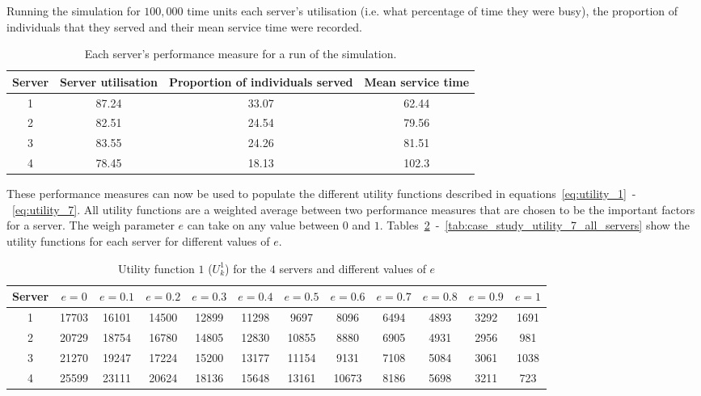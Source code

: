 Running the simulation for \(100,000\) time units each server's utilisation
(i.e. what percentage of time they were busy), the proportion of individuals
that they served and their mean service time were recorded.

\begin{table}[H]
    \caption{Each server's performance measure for a run of the simulation.}
    \label{tab:case_study_server_metrics}
    \begin{tabular}{|c|c|c|c|}
        \hline
        Server & Server utilisation & Proportion of individuals served &
        Mean service time \\
        \hline
        1 & 87.24 & 33.07 & 62.44 \\
        2 & 82.51 & 24.54 & 79.56 \\
        3 & 83.55 & 24.26 & 81.51 \\
        4 & 78.45 & 18.13 & 102.3 \\
        \hline
    \end{tabular}
\end{table}

These performance measures can now be used to populate the different utility
functions described in equations~\eqref{eq:utility_1}~-~\eqref{eq:utility_7}.
All utility functions are a weighted average between two performance measures
that are chosen to be the important factors for a server.
The weigh parameter \(e\) can take on any value between \(0\) and \(1\).
Tables~\ref{tab:case_study_utility_1_all_servers}~-~\ref{tab:case_study_utility_7_all_servers}
show the utility functions for each server for different values of \(e\).

\begin{table}[H]
    \caption{Utility function \(1\) (\(U_k^1\)) for the \(4\) servers and
    different values of \(e\)}
    \label{tab:case_study_utility_1_all_servers}
    \begin{adjustbox}{width=\columnwidth,center}
        \begin{tabular}{|c|c|c|c|c|c|c|c|c|c|c|c|}
            \hline
            Server & \(e = 0\) & \(e = 0.1\) & \(e = 0.2\) & \(e = 0.3\)
                   & \(e = 0.4\) & \(e = 0.5\) & \(e = 0.6\) & \(e = 0.7\)
                   & \(e = 0.8\) & \(e = 0.9\) & \(e = 1\) \\
            \hline
            1 & 17703 & 16101 &	14500 & 12899 & 11298 & 9697 & 8096 & 6494
                & 4893 & 3292 & 1691 \\
            2 & 20729 & 18754 &	16780 & 14805 & 12830 & 10855 & 8880 & 6905
                & 4931 & 2956 & 981 \\
            3 & 21270 & 19247 & 17224 & 15200 & 13177 & 11154 & 9131 & 7108
                & 5084 & 3061 & 1038 \\
            4 & 25599 & 23111 &	20624 & 18136 & 15648 & 13161 & 10673 & 8186
                & 5698 & 3211 & 723 \\
            \hline
        \end{tabular}
    \end{adjustbox}
\end{table}

